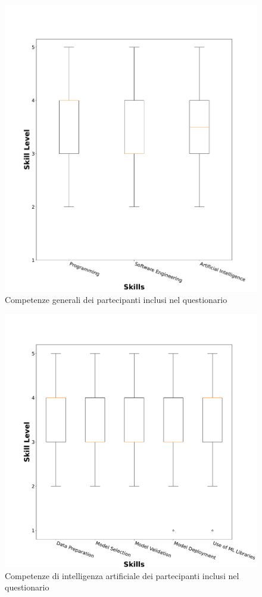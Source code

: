\begin{figure}[h!]
    \centering
    \includegraphics[width=\textwidth]{Figure/Results/SurveyResults/prescreening/def_skills_participant.pdf}
    \caption{Competenze generali dei partecipanti inclusi nel questionario}
    \label{fig:general_skills}
\end{figure}

\begin{figure}[h!]
    \centering
    \includegraphics[width=\textwidth]{Figure/Results/SurveyResults/prescreening/def_ai_skills_participant.pdf}
    \caption{Competenze di intelligenza artificiale dei partecipanti inclusi nel questionario}
    \label{fig:ai_skills}
\end{figure}


